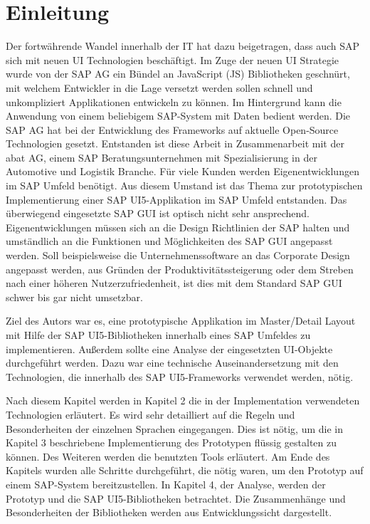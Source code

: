 \section{Einleitung}\label{einleitung}
Der fortwährende Wandel innerhalb der IT hat dazu beigetragen, dass auch SAP sich mit neuen UI Technologien beschäftigt. Im Zuge der neuen UI Strategie wurde von der SAP AG ein Bündel an JavaScript (JS) Bibliotheken geschnürt, mit welchem Entwickler in die Lage versetzt werden sollen schnell und unkompliziert Applikationen entwickeln zu können. Im Hintergrund kann die Anwendung von einem beliebigem SAP-System mit Daten bedient werden. Die SAP AG hat bei der Entwicklung des Frameworks auf aktuelle Open-Source Technologien gesetzt. Entstanden ist diese Arbeit in Zusammenarbeit mit der abat AG, einem SAP Beratungsunternehmen mit Spezialisierung in der Automotive und Logistik Branche. Für viele Kunden werden Eigenentwicklungen im SAP Umfeld benötigt. Aus diesem Umstand ist das Thema zur prototypischen Implementierung einer SAP UI5-Applikation im SAP Umfeld entstanden. Das überwiegend eingesetzte SAP GUI ist optisch nicht sehr ansprechend. Eigenentwicklungen müssen sich an die Design Richtlinien der SAP halten und umständlich an die Funktionen und Möglichkeiten des SAP GUI angepasst werden. Soll beispielsweise die Unternehmenssoftware an das Corporate Design angepasst werden, aus Gründen der Produktivitätssteigerung oder dem Streben nach einer höheren Nutzerzufriedenheit, ist dies mit dem Standard SAP GUI schwer bis gar nicht umsetzbar.\par
Ziel des Autors war es, eine prototypische Applikation im Master/Detail Layout mit Hilfe der SAP UI5-Bibliotheken innerhalb eines SAP Umfeldes zu implementieren. Außerdem sollte eine Analyse der eingesetzten UI-Objekte durchgeführt werden. Dazu war eine technische Auseinandersetzung mit den Technologien, die innerhalb des SAP UI5-Frameworks verwendet werden, nötig.\par
Nach diesem Kapitel werden in Kapitel 2 die in der Implementation verwendeten Technologien erläutert. Es wird sehr detailliert auf die Regeln und Besonderheiten der einzelnen Sprachen eingegangen. Dies ist nötig, um die in Kapitel 3 beschriebene Implementierung des Prototypen flüssig gestalten zu können. Des Weiteren werden die benutzten Tools erläutert. Am Ende des Kapitels wurden alle Schritte durchgeführt, die nötig waren, um den Prototyp auf einem SAP-System bereitzustellen. In Kapitel 4, der Analyse, werden der Prototyp und die SAP UI5-Bibliotheken betrachtet. Die Zusammenhänge und Besonderheiten der Bibliotheken werden aus Entwicklungssicht dargestellt.